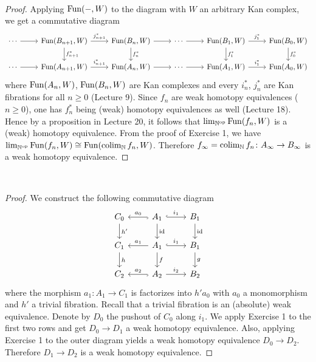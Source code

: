 \documentclass[a4paper,11pt,openany]{scrartcl}
\begin{document}
~\\
\begin{proof}
Applying $\operatorname{Fun}(-,W)$ to the diagram with $W$ an arbitrary Kan complex, we get a commutative diagram
\[
\begin{tikzcd}
\cdots\arrow[r]& \Fun(B_{n+1},W)\arrow[r,"j_{n+1}^*"]\arrow[d,"f_{n+1}^*"]& \Fun(B_n,W)\arrow[r]\arrow[d,"f_n^*"]& \cdots\arrow[r]& \Fun(B_1,W)\arrow[r,"j_1^*"]\arrow[d,"f_1^*"]& \Fun(B_0,W)\arrow[d,"f_0^*"]\\
\cdots\arrow[r]& \Fun(A_{n+1},W)\arrow[r,"i_{n+1}^*"]& \Fun(A_n,W)\arrow[r]& \cdots\arrow[r]& \Fun(A_1,W)\arrow[r,"i_1^*"]& \Fun(A_0,W)
\end{tikzcd}
\]
where $\operatorname{Fun}(A_n,W)$, $\operatorname{Fun}(B_n,W)$ are Kan complexes and every $i_n^*$, $j_n^*$ are Kan fibrations for all $n\geqslant0$ (Lecture 9). Since $f_n$ are weak homotopy equivalences ($n\geqslant0$), one has $f_n^*$ being (weak) homotopy equivalences as well (Lecture 18). Hence by a proposition in Lecture 20, it follows that $\lim_{\mathbb{N}^{\operatorname{op}}}\operatorname{Fun}(f_n,W)$ is a (weak) homotopy equivalence. From the proof of Exercise 1, we have $\lim_{\mathbb{N}^{\operatorname{op}}}\operatorname{Fun}(f_n,W)\cong\operatorname{Fun}(\operatorname{colim}_{\mathbb{N}}f_n,W)$. Therefore $f_\infty=\operatorname{colim}_{\mathbb{N}}f_n\colon A_\infty\to B_\infty$ is a weak homotopy equivalence.
\end{proof}

~\\
\begin{proof}
We construct the following commutative diagram
\[
\begin{tikzcd}
C_0\arrow[d,"h'"]& A_1\arrow[r,hookrightarrow,"i_1"]\arrow[d,"\id"]\arrow[l,hookrightarrow,"a_0"']& B_1\arrow[d,"\id"]\\
C_1\arrow[d,"h"]& A_1\arrow[r,hookrightarrow,"i_1"]\arrow[d,"f"]\arrow[l,"a_1"']& B_1\arrow[d,"g"]\\
C_2& A_2\arrow[r,"i_2"]\arrow[l,hookrightarrow,"a_2"']& B_2
\end{tikzcd}
\]
where the morphism $a_1\colon A_1\to C_1$ is factorizes into $h'a_0$ with $a_0$ a monomorphism and $h'$ a trivial fibration. Recall that a trivial fibration is an (absolute) weak equivalence. Denote by $D_0$ the pushout of $C_0$ along $i_1$. We apply Exercise 1 to the first two rows and get $D_0\to D_1$ a weak homotopy equivalence. Also, applying Exercise 1 to the outer diagram yields a weak homotopy equivalence $D_0\to D_2$. Therefore $D_1\to D_2$ is a weak homotopy equivalence.
\end{proof}
\end{document}
